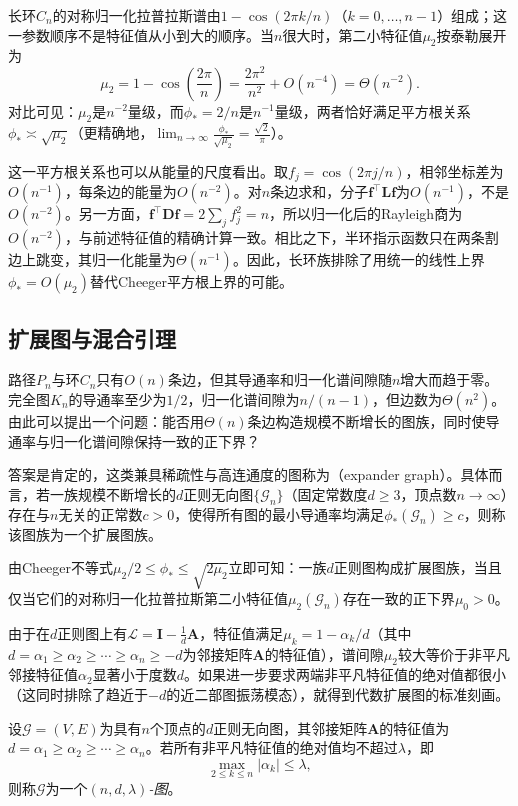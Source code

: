 长环$C_n$的对称归一化拉普拉斯谱由$1-\cos(2\pi k/n)$（$k=0,\ldots,n-1$）组成；这一参数顺序不是特征值从小到大的顺序。当$n$很大时，第二小特征值$\mu_2$按泰勒展开为
\[
  \mu_2 = 1-\cos\left(\frac{2\pi}{n}\right) = \frac{2\pi^2}{n^2} + O(n^{-4}) = \Theta(n^{-2}).
\]
对比可见：$\mu_2$是$n^{-2}$量级，而$\phi_*=2/n$是$n^{-1}$量级，两者恰好满足平方根关系$\phi_*\asymp\sqrt{\mu_2}$（更精确地，$\lim_{n\to\infty}\frac{\phi_*}{\sqrt{\mu_2}}=\frac{\sqrt 2}{\pi}$）。

这一平方根关系也可以从能量的尺度看出。取$f_j=\cos(2\pi j/n)$，相邻坐标差为$O(n^{-1})$，每条边的能量为$O(n^{-2})$。对$n$条边求和，分子$\bm f^\top\bm L\bm f$为$O(n^{-1})$，不是$O(n^{-2})$。另一方面，$\bm f^\top\bm D\bm f=2\sum_j f_j^2=n$，所以归一化后的Rayleigh商为$O(n^{-2})$，与前述特征值的精确计算一致。相比之下，半环指示函数只在两条割边上跳变，其归一化能量为$\Theta(n^{-1})$。因此，长环族排除了用统一的线性上界$\phi_*=O(\mu_2)$替代Cheeger平方根上界的可能。

\subsection{扩展图与混合引理}
\label{sec:graph-expander-mixing}

路径$P_n$与环$C_n$只有$O(n)$条边，但其导通率和归一化谱间隙随$n$增大而趋于零。完全图$K_n$的导通率至少为$1/2$，归一化谱间隙为$n/(n-1)$，但边数为$\Theta(n^2)$。由此可以提出一个问题：能否用$\Theta(n)$条边构造规模不断增长的图族，同时使导通率与归一化谱间隙保持一致的正下界？

答案是肯定的，这类兼具稀疏性与高连通度的图称为（expander graph）。具体而言，若一族规模不断增长的$d$正则无向图$\{\mathcal G_n\}$（固定常数度$d\ge 3$，顶点数$n\to\infty$）存在与$n$无关的正常数$c>0$，使得所有图的最小导通率均满足$\phi_*(\mathcal G_n)\ge c$，则称该图族为一个扩展图族。

由Cheeger不等式$\mu_2/2\le\phi_*\le\sqrt{2\mu_2}$立即可知：一族$d$正则图构成扩展图族，当且仅当它们的对称归一化拉普拉斯第二小特征值$\mu_2(\mathcal G_n)$存在一致的正下界$\mu_0>0$。

由于在$d$正则图上有$\mathcal L=\bm I-\frac{1}{d}\bm A$，特征值满足$\mu_k=1-\alpha_k/d$（其中$d=\alpha_1\ge\alpha_2\ge\cdots\ge\alpha_n\ge -d$为邻接矩阵$\bm A$的特征值），谱间隙$\mu_2$较大等价于非平凡邻接特征值$\alpha_2$显著小于度数$d$。如果进一步要求两端非平凡特征值的绝对值都很小（这同时排除了趋近于$-d$的近二部图振荡模态），就得到代数扩展图的标准刻画。

\begin{definition}[$(n,d,\lambda)$-图]
\label{def:graph-n-d-lambda}
设$\mathcal G=(V,E)$为具有$n$个顶点的$d$正则无向图，其邻接矩阵$\bm A$的特征值为$d=\alpha_1\ge\alpha_2\ge\cdots\ge\alpha_n$。若所有非平凡特征值的绝对值均不超过$\lambda$，即
\begin{equation}
\label{eq:graph-n-d-lambda}
\max_{2\le k\le n}|\alpha_k|\le\lambda,
\end{equation}
则称$\mathcal G$为一个\emph{$(n,d,\lambda)$-图}。
\end{definition}

